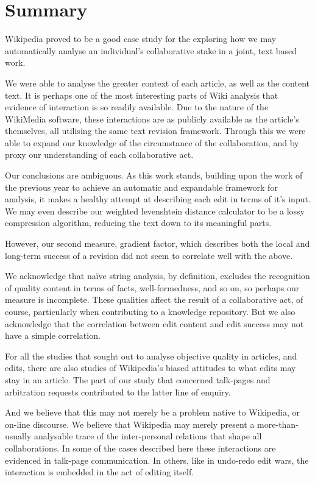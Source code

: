 \section{Summary}
Wikipedia proved to be a good case study for the exploring how we may
automatically analyse an individual's collaborative stake in a joint,
text based work.

We were able to analyse the greater context of each article, as well
as the content text. It is perhaps one of the most interesting parts
of Wiki analysis that evidence of interaction is so readily
available. Due to the nature of the WikiMedia software, these
interactions are as publicly available as the article's themselves,
all utilising the same text revision framework. Through this we were
able to expand our knowledge of the circumstance of the collaboration,
and by proxy our understanding of each collaborative act.

Our conclusions are ambiguous. As this work stands, building upon the
work of the previous year to achieve an automatic and expandable
framework for analysis, it makes a healthy attempt at describing each
edit in terms of it's input. We may even describe our weighted
levenshtein distance calculator to be a lossy compression algorithm,
reducing the text down to its meaningful parts.

However, our second measure, gradient factor, which describes both the
local and long-term success of a revision did not seem to correlate
well with the above.

We acknowledge that na\"ive string analysis, by definition, excludes
the recognition of quality content in terms of facts, well-formedness,
and so on, so perhaps our measure is incomplete. These qualities
affect the result of a collaborative act, of course, particularly when
contributing to a knowledge repository. But we also acknowledge that
the correlation between edit content and edit success may not have a
simple correlation.

For all the studies that sought out to analyse objective quality in
articles, and edits, there are also studies of Wikipedia's biased
attitudes to what edits may stay in an article. The part of our study
that concerned talk-pages and arbitration requests contributed to the
latter line of enquiry.

And we believe that this may not merely be a problem native to
Wikipedia, or on-line discourse. We believe that Wikipedia may merely
present a more-than-usually analysable trace of the inter-personal
relations that shape all collaborations. In some of the cases
described here these interactions are evidenced in talk-page
communication. In others, like in undo-redo edit wars, the interaction
is embedded in the act of editing itself. 

